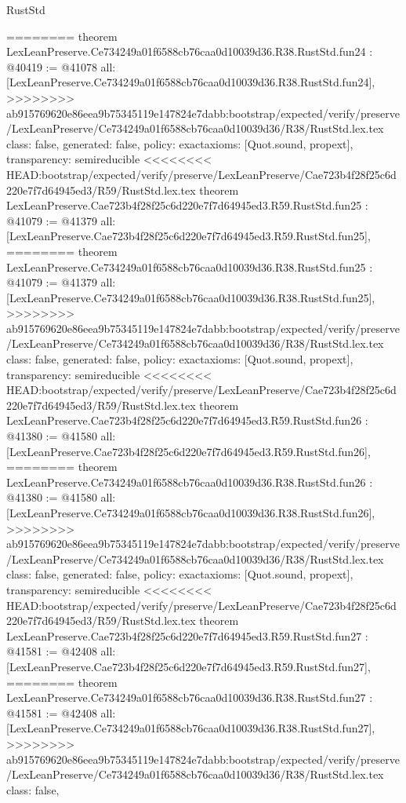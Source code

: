 \begin{lexlean}{RustStd}
\begin{coremodule}
{\begin{coremodule}
{{{{{{{{{{{{{{{{{{{{{{{{{{{========
theorem LexLeanPreserve.Ce734249a01f6588cb76caa0d10039d36.R38.RustStd.fun24 : @40419 := @41078 {
  all: [LexLeanPreserve.Ce734249a01f6588cb76caa0d10039d36.R38.RustStd.fun24],
>>>>>>>> ab915769620e86eea9b75345119e147824e7dabb:bootstrap/expected/verify/preserve/LexLeanPreserve/Ce734249a01f6588cb76caa0d10039d36/R38/RustStd.lex.tex
  class: false,
  generated: false,
  policy: exact{axioms: [Quot.sound, propext]},
  transparency: semireducible
}
<<<<<<<< HEAD:bootstrap/expected/verify/preserve/LexLeanPreserve/Cae723b4f28f25c6d220e7f7d64945ed3/R59/RustStd.lex.tex
theorem LexLeanPreserve.Cae723b4f28f25c6d220e7f7d64945ed3.R59.RustStd.fun25 : @41079 := @41379 {
  all: [LexLeanPreserve.Cae723b4f28f25c6d220e7f7d64945ed3.R59.RustStd.fun25],
========
theorem LexLeanPreserve.Ce734249a01f6588cb76caa0d10039d36.R38.RustStd.fun25 : @41079 := @41379 {
  all: [LexLeanPreserve.Ce734249a01f6588cb76caa0d10039d36.R38.RustStd.fun25],
>>>>>>>> ab915769620e86eea9b75345119e147824e7dabb:bootstrap/expected/verify/preserve/LexLeanPreserve/Ce734249a01f6588cb76caa0d10039d36/R38/RustStd.lex.tex
  class: false,
  generated: false,
  policy: exact{axioms: [Quot.sound, propext]},
  transparency: semireducible
}
<<<<<<<< HEAD:bootstrap/expected/verify/preserve/LexLeanPreserve/Cae723b4f28f25c6d220e7f7d64945ed3/R59/RustStd.lex.tex
theorem LexLeanPreserve.Cae723b4f28f25c6d220e7f7d64945ed3.R59.RustStd.fun26 : @41380 := @41580 {
  all: [LexLeanPreserve.Cae723b4f28f25c6d220e7f7d64945ed3.R59.RustStd.fun26],
========
theorem LexLeanPreserve.Ce734249a01f6588cb76caa0d10039d36.R38.RustStd.fun26 : @41380 := @41580 {
  all: [LexLeanPreserve.Ce734249a01f6588cb76caa0d10039d36.R38.RustStd.fun26],
>>>>>>>> ab915769620e86eea9b75345119e147824e7dabb:bootstrap/expected/verify/preserve/LexLeanPreserve/Ce734249a01f6588cb76caa0d10039d36/R38/RustStd.lex.tex
  class: false,
  generated: false,
  policy: exact{axioms: [Quot.sound, propext]},
  transparency: semireducible
}
<<<<<<<< HEAD:bootstrap/expected/verify/preserve/LexLeanPreserve/Cae723b4f28f25c6d220e7f7d64945ed3/R59/RustStd.lex.tex
theorem LexLeanPreserve.Cae723b4f28f25c6d220e7f7d64945ed3.R59.RustStd.fun27 : @41581 := @42408 {
  all: [LexLeanPreserve.Cae723b4f28f25c6d220e7f7d64945ed3.R59.RustStd.fun27],
========
theorem LexLeanPreserve.Ce734249a01f6588cb76caa0d10039d36.R38.RustStd.fun27 : @41581 := @42408 {
  all: [LexLeanPreserve.Ce734249a01f6588cb76caa0d10039d36.R38.RustStd.fun27],
>>>>>>>> ab915769620e86eea9b75345119e147824e7dabb:bootstrap/expected/verify/preserve/LexLeanPreserve/Ce734249a01f6588cb76caa0d10039d36/R38/RustStd.lex.tex
  class: false,
}}}}}}}}}}}}}}}}}}}}}}}}}}}}}}}
\end{coremodule}}
\end{coremodule}
\end{lexlean}
